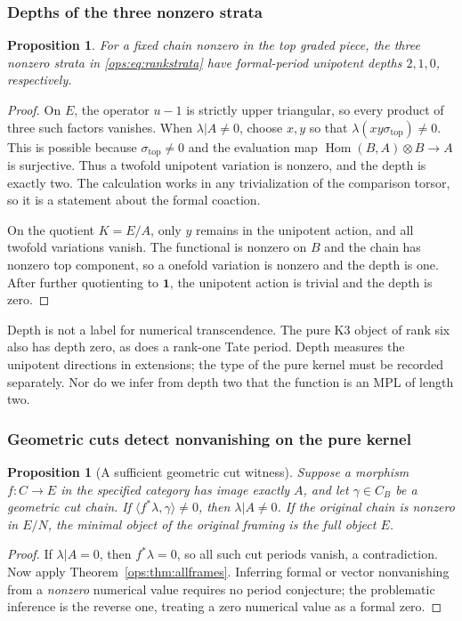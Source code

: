 \documentclass[11pt,a4paper,oneside]{article}
\theoremstyle{plain}
\newtheorem{proposition}[theorem]{Proposition}
\theoremstyle{definition}
\theoremstyle{remark}
\newcommand{\Hom}{\operatorname{Hom}}
\numberwithin{equation}{section}
\begin{document}
\subsubsection{Depths of the three nonzero strata}
\begin{proposition}\label{ops:prop:depth}
For a fixed chain nonzero in the top graded piece, the three nonzero strata in \eqref{ops:eq:rankstrata} have
formal-period unipotent depths $2,1,0$, respectively.
\end{proposition}
\begin{proof}
On $E$, the operator $u-1$ is strictly upper triangular, so every product of three such factors vanishes.
When $\lambda|A\ne0$, choose $x,y$ so that $\lambda(xy\sigma_{\mathrm{top}})\ne0$.
This is possible because $\sigma_{\mathrm{top}}\ne0$ and
the evaluation map $\Hom(B,A)\otimes B\to A$ is surjective.
Thus a twofold unipotent variation is nonzero, and the depth is exactly two.
The calculation works in any trivialization of the comparison torsor, so it is a statement about the formal coaction.

On the quotient $K=E/A$, only $y$ remains in the unipotent action, and all twofold variations vanish.
The functional is nonzero on $B$ and the chain has nonzero top component, so a onefold variation is nonzero and the depth is one.
After further quotienting to $\mathbf1$, the unipotent action is trivial and the depth is zero.
\end{proof}

Depth is not a label for numerical transcendence. The pure K3 object of rank six also has depth zero,
as does a rank-one Tate period. Depth measures the unipotent directions in extensions;
the type of the pure kernel must be recorded separately. Nor do we infer from depth two that the function is an MPL of length two.

\subsubsection{Geometric cuts detect nonvanishing on the pure kernel}
\begin{proposition}[A sufficient geometric cut witness]\label{ops:prop:cutwitness}
Suppose a morphism $f:C\to E$ in the specified category has image exactly $A$,
and let $\gamma\in C_B$ be a geometric cut chain.
If $\langle f^*\lambda,\gamma\rangle\ne0$,
then $\lambda|A\ne0$.
If the original chain is nonzero in $E/N$, the minimal object of the original framing is the full object $E$.
\end{proposition}
\begin{proof}
If $\lambda|A=0$, then $f^*\lambda=0$, so all such cut periods vanish, a contradiction.
Now apply Theorem~\ref{ops:thm:allframes}.
Inferring formal or vector nonvanishing from a \emph{nonzero} numerical value requires no period conjecture;
the problematic inference is the reverse one, treating a zero numerical value as a formal zero.
\end{proof}
\end{document}

